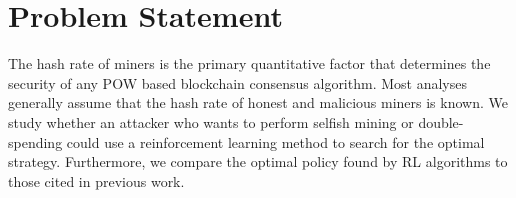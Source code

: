 
\section{Problem Statement}
The hash rate of miners is the primary quantitative factor that determines the security of any POW based blockchain consensus algorithm. Most analyses generally assume that the hash rate of honest and malicious miners is known.
We study whether an attacker who wants to perform selfish mining or double-spending could use a reinforcement learning method to search for the optimal strategy. Furthermore, we compare the optimal policy found by RL algorithms to those cited in previous work.

